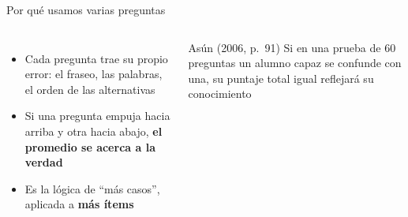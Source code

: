 \documentclass[aspectratio=169,11pt]{beamer}
\newcommand{\hl}[1]{\textcolor{marino}{\textbf{#1}}}        %
\begin{document}
\begin{frame}{Por qué usamos varias preguntas}
\begin{columns}[c]
\begin{itemize}
  \item Cada pregunta trae su propio error: el fraseo, las palabras, el orden de las alternativas
  \item Si una pregunta empuja hacia arriba y otra hacia abajo, \hl{el promedio se acerca a la verdad}
  \item Es la lógica de ``más casos'', aplicada a \textbf{más ítems}
\end{itemize}
\bigskip
\begin{exampleblock}{Asún (2006, p.~91)}
\small
Si en una prueba de 60 preguntas un alumno capaz se confunde con una, su puntaje total igual reflejará su conocimiento
\end{exampleblock}
\centering
{}
\end{columns}
\end{frame}
\end{document}
